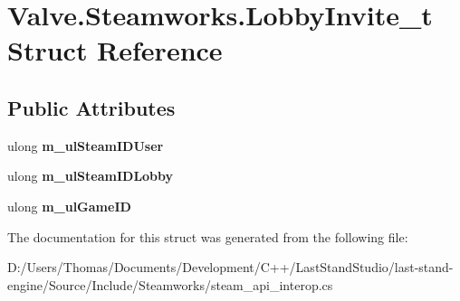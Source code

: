 \hypertarget{structValve_1_1Steamworks_1_1LobbyInvite__t}{}\section{Valve.\+Steamworks.\+Lobby\+Invite\+\_\+t Struct Reference}
\label{structValve_1_1Steamworks_1_1LobbyInvite__t}
\subsection*{Public Attributes}
\begin{DoxyCompactItemize}
\item 
\hypertarget{structValve_1_1Steamworks_1_1LobbyInvite__t_a866f73d99ca204111003f283eb065a4b}{}ulong {\bfseries m\+\_\+ul\+Steam\+I\+D\+User}\label{structValve_1_1Steamworks_1_1LobbyInvite__t_a866f73d99ca204111003f283eb065a4b}

\item 
\hypertarget{structValve_1_1Steamworks_1_1LobbyInvite__t_a603ba13cfd9eb3b479fcef11fc84c894}{}ulong {\bfseries m\+\_\+ul\+Steam\+I\+D\+Lobby}\label{structValve_1_1Steamworks_1_1LobbyInvite__t_a603ba13cfd9eb3b479fcef11fc84c894}

\item 
\hypertarget{structValve_1_1Steamworks_1_1LobbyInvite__t_accd8704af176195d956cfffcb39bf43e}{}ulong {\bfseries m\+\_\+ul\+Game\+I\+D}\label{structValve_1_1Steamworks_1_1LobbyInvite__t_accd8704af176195d956cfffcb39bf43e}

\end{DoxyCompactItemize}


The documentation for this struct was generated from the following file\+:\begin{DoxyCompactItemize}
\item 
D\+:/\+Users/\+Thomas/\+Documents/\+Development/\+C++/\+Last\+Stand\+Studio/last-\/stand-\/engine/\+Source/\+Include/\+Steamworks/steam\+\_\+api\+\_\+interop.\+cs\end{DoxyCompactItemize}

